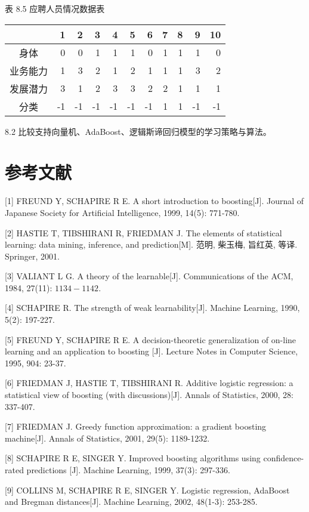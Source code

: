 \documentclass[10pt]{article}
\begin{document}
表 8.5 应聘人员情况数据表

\begin{center}
\begin{tabular}{crrrrrrrrrr}
\hline\hline
 & 1 & 2 & 3 & 4 & 5 & 6 & 7 & 8 & 9 & 10 \\
\hline
身体 & 0 & 0 & 1 & 1 & 1 & 0 & 1 & 1 & 1 & 0 \\
业务能力 & 1 & 3 & 2 & 1 & 2 & 1 & 1 & 1 & 3 & 2 \\
发展潜力 & 3 & 1 & 2 & 3 & 3 & 2 & 2 & 1 & 1 & 1 \\
分类 & -1 & -1 & -1 & -1 & -1 & -1 & 1 & 1 & -1 & -1 \\
\hline
\end{tabular}
\end{center}

8.2 比较支持向量机、AdaBoost、逻辑斯谛回归模型的学习策略与算法。

\section*{参考文献}
[1] FREUND Y, SCHAPIRE R E. A short introduction to boosting[J]. Journal of Japanese Society for Artificial Intelligence, 1999, 14(5): 771-780.

[2] HASTIE T, TIBSHIRANI R, FRIEDMAN J. The elements of statistical learning: data mining, inference, and prediction[M]. 范明, 柴玉梅, 旨红英, 等译. Springer, 2001.

[3] VALIANT L G. A theory of the learnable[J]. Communications of the ACM, 1984, 27(11): $1134-1142$.

[4] SCHAPIRE R. The strength of weak learnability[J]. Machine Learning, 1990, 5(2): 197-227.

[5] FREUND Y, SCHAPIRE R E. A decision-theoretic generalization of on-line learning and an application to boosting [J]. Lecture Notes in Computer Science, 1995, 904: 23-37.

[6] FRIEDMAN J, HASTIE T, TIBSHIRANI R. Additive logistic regression: a statistical view of boosting (with discussions)[J]. Annals of Statistics, 2000, 28: 337-407.

[7] FRIEDMAN J. Greedy function approximation: a gradient boosting machine[J]. Annals of Statistics, 2001, 29(5): 1189-1232.

[8] SCHAPIRE R E, SINGER Y. Improved boosting algorithms using confidence-rated predictions [J]. Machine Learning, 1999, 37(3): 297-336.

[9] COLLINS M, SCHAPIRE R E, SINGER Y. Logistic regression, AdaBoost and Bregman distances[J]. Machine Learning, 2002, 48(1-3): 253-285.
\end{document}
